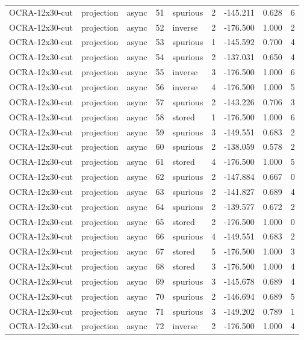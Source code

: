 \begin{tabular}{lllrlrrrr}
OCRA-12x30-cut & projection & async & 51 & spurious & 2 & -145.211 & 0.628 & 6 \\
OCRA-12x30-cut & projection & async & 52 & inverse & 2 & -176.500 & 1.000 & 2 \\
OCRA-12x30-cut & projection & async & 53 & spurious & 1 & -145.592 & 0.700 & 4 \\
OCRA-12x30-cut & projection & async & 54 & spurious & 2 & -137.031 & 0.650 & 4 \\
OCRA-12x30-cut & projection & async & 55 & inverse & 3 & -176.500 & 1.000 & 6 \\
OCRA-12x30-cut & projection & async & 56 & inverse & 4 & -176.500 & 1.000 & 5 \\
OCRA-12x30-cut & projection & async & 57 & spurious & 2 & -143.226 & 0.706 & 3 \\
OCRA-12x30-cut & projection & async & 58 & stored & 1 & -176.500 & 1.000 & 6 \\
OCRA-12x30-cut & projection & async & 59 & spurious & 3 & -149.551 & 0.683 & 2 \\
OCRA-12x30-cut & projection & async & 60 & spurious & 2 & -138.059 & 0.578 & 2 \\
OCRA-12x30-cut & projection & async & 61 & stored & 4 & -176.500 & 1.000 & 5 \\
OCRA-12x30-cut & projection & async & 62 & spurious & 2 & -147.884 & 0.667 & 0 \\
OCRA-12x30-cut & projection & async & 63 & spurious & 2 & -141.827 & 0.689 & 4 \\
OCRA-12x30-cut & projection & async & 64 & spurious & 2 & -139.577 & 0.672 & 2 \\
OCRA-12x30-cut & projection & async & 65 & stored & 2 & -176.500 & 1.000 & 0 \\
OCRA-12x30-cut & projection & async & 66 & spurious & 4 & -149.551 & 0.683 & 2 \\
OCRA-12x30-cut & projection & async & 67 & stored & 5 & -176.500 & 1.000 & 3 \\
OCRA-12x30-cut & projection & async & 68 & stored & 3 & -176.500 & 1.000 & 4 \\
OCRA-12x30-cut & projection & async & 69 & spurious & 3 & -145.678 & 0.689 & 4 \\
OCRA-12x30-cut & projection & async & 70 & spurious & 2 & -146.694 & 0.689 & 5 \\
OCRA-12x30-cut & projection & async & 71 & spurious & 3 & -149.202 & 0.789 & 1 \\
OCRA-12x30-cut & projection & async & 72 & inverse & 2 & -176.500 & 1.000 & 4 \\

\end{tabular}
